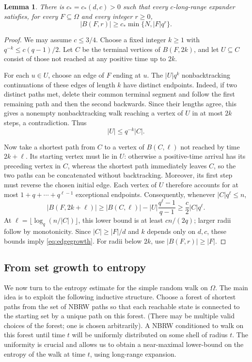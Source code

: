 \documentclass[11pt,reqno]{amsart}
\newtheorem{lemma}[theorem]{Lemma}
\theoremstyle{definition}
\begin{document}
\begin{lemma}\label{lem:transfer}
There is $c_*=c_*(d,c)>0$ such that every $c$-long-range expander satisfies, for every $F \subseteq \Omega$ and every integer $r\ge0$,
\begin{equation}\label{eq:edgegrowth}
    |B(F,r)|\ge c_*\min\{N,|F|q^r\}.
\end{equation}
\end{lemma}

\begin{proof}
We may assume $c\le3/4$. Choose a fixed integer $k\ge1$ with $q^{-k}\le c(q-1)/2$.
Let $C$ be the terminal vertices of $B(F,2k)$,
and let $U\subseteq C$ consist of those not reached at any
positive time up to $2k$.

For each $u\in U$, choose an edge of $F$ ending at $u$.
The $|U|q^k$ nonbacktracking continuations of these edges
of length $k$ have distinct endpoints. Indeed, if two
distinct paths met, delete their common terminal segment
and follow the first remaining path and then the second
backwards. Since their lengths agree, this gives a nonempty
nonbacktracking walk reaching a vertex of $U$ in at most
$2k$ steps, a contradiction. Thus
\[
 |U|\le q^{-k}|C|.
\]

Now take a shortest path from $C$ to a vertex of $B(C,\ell)$
not reached by time $2k+\ell$. Its starting vertex must lie
in $U$: otherwise a positive-time arrival has its preceding
vertex in $C$, whereas the shortest path immediately leaves
$C$, so the two paths can be concatenated without backtracking.
Moreover, its first step must reverse the chosen initial
edge. Each vertex of $U$ therefore accounts for at most
$1+q+\cdots+q^{\ell-1}$ exceptional endpoints. Consequently,
whenever $|C|q^\ell\le n$,
\[
 |B(F,2k+\ell)|
 \ge |B(C,\ell)|-|U|\frac{q^\ell-1}{q-1}
 \ge \frac c2|C|q^\ell.
\]
At $\ell=\lfloor\log_q(n/|C|)\rfloor$, this lower bound
is at least $cn/(2q)$; larger radii follow by monotonicity.
Since $|C|\ge |F|/d$ and $k$ depends only on $d,c$,
these bounds imply \eqref{eq:edgegrowth}.
For radii below $2k$, use $|B(F,r)|\ge |F|$.
\end{proof}
\subsection{From set growth to entropy}\label{sec:entropy}


We now turn to the entropy estimate for the simple random walk on $\Omega$. The main idea is to exploit the following inductive structure. Choose a forest of shortest paths from the set of NBRW paths so that each reachable state is connected to the starting set by a unique path on this forest. (There may be multiple valid choices of the forest; one is chosen arbitrarily). A NBRW conditioned to walk on this forest until time $t$ will be uniformly distributed on some shell of radius $t$. The uniformity is crucial and allows us to obtain a near-maximal lower-bound on the entropy of the walk at time $t$, using long-range expansion. 
\end{document}
